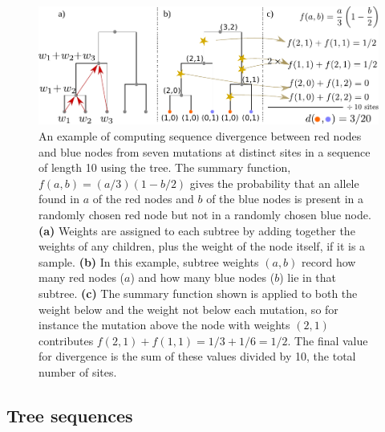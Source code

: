 \documentclass{article}
\begin{document}
\begin{figure}
    \centering
    \includegraphics{figures/divergence_diagram}
    \caption{
        An example of computing sequence divergence between red nodes and blue nodes
        from seven mutations at distinct sites in a sequence of length 10 using the tree.
        The summary function, $f(a,b) = (a/3)(1-b/2)$ gives the probability that
        an allele found in $a$ of the red nodes and $b$ of the blue nodes is present in
        a randomly chosen red node but not in a randomly chosen blue node.
        \textbf{(a)} Weights are assigned to each subtree by adding together the weights of any children,
        plus the weight of the node itself, if it is a sample.
        \textbf{(b)} In this example, subtree weights $(a,b)$ record how many red nodes ($a$)
        and how many blue nodes ($b$) lie in that subtree.
        \textbf{(c)} The summary function shown is applied to both the weight below 
        and the weight not below each mutation,
        so for instance the mutation above the node with weights $(2,1)$
        contributes $f(2,1) + f(1,1) = 1/3 + 1/6 = 1/2$.
        The final value for divergence is the sum of these values divided by 10,
        the total number of sites.
        \label{fig:divergence_diagram}
    }
\end{figure}


\subsection*{Tree sequences}
\end{document}

